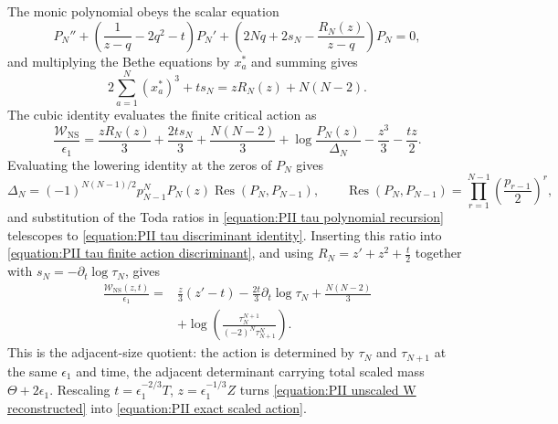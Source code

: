 \documentclass[a4paper,11pt]{article}
\numberwithin{equation}{section}
\begin{document}
The monic polynomial obeys the scalar equation
\begin{equation}
\label{equation:PII unscaled polynomial ode}
P_{N}''+\left(\frac{1}{z-q}-2q^{2}-t\right)P_{N}'
+\left(2Nq+2s_{N}-\frac{R_{N}(z)}{z-q}\right)P_{N}=0,
\end{equation}
and multiplying the Bethe equations by $x_{a}^{*}$ and summing
gives
\begin{equation}
\label{equation:PII unscaled cubic sum}
2\sum_{a=1}^{N}(x_{a}^{*})^{3}+ts_{N}=zR_{N}(z)+N(N-2).
\end{equation}
The cubic identity evaluates the finite critical action as
\begin{equation}
\label{equation:PII tau finite action discriminant}
\frac{\mathcal{W}_{\mathrm{NS}}}{\epsilon_{1}}
=\frac{zR_{N}(z)}{3}+\frac{2ts_{N}}{3}
+\frac{N(N-2)}{3}
+\log{\frac{P_{N}(z)}{\Delta_{N}}}
-\frac{z^{3}}{3}-\frac{tz}{2}.
\end{equation}
Evaluating the lowering identity at the zeros of $P_{N}$ gives
\begin{equation}
\label{equation:PII tau resultant}
\Delta_{N}=(-1)^{N(N-1)/2}p_{N-1}^{N}P_{N}(z)
\operatorname{Res}{(P_{N},P_{N-1})},
\qquad
\operatorname{Res}{(P_{N},P_{N-1})}
=\prod_{r=1}^{N-1}\left(\frac{p_{r-1}}{2}\right)^{r},
\end{equation}
and substitution of the Toda ratios in
\eqref{equation:PII tau polynomial recursion} telescopes to
\eqref{equation:PII tau discriminant identity}.  Inserting this
ratio into \eqref{equation:PII tau finite action discriminant}, and
using $R_{N}=z'+z^{2}+\frac{t}{2}$ together with
$s_{N}=-\partial_{t}\log{\tau_{N}}$, gives
\begin{equation}
\label{equation:PII unscaled W reconstructed}
\begin{aligned}
\frac{\mathcal{W}_{\mathrm{NS}}(z,t)}{\epsilon_{1}}
={}&\frac{z}{3}(z'-t)
-\frac{2t}{3}\partial_{t}\log{\tau_{N}}
+\frac{N(N-2)}{3}\\
&+\log{\left(\frac{\tau_{N}^{N+1}}{(-2)^{N}\tau_{N+1}^{N}}\right)}.
\end{aligned}
\end{equation}
This is the adjacent-size quotient: the action is determined by
$\tau_{N}$ and $\tau_{N+1}$ at the same $\epsilon_{1}$ and time, the
adjacent determinant carrying total scaled mass
$\Theta+2\epsilon_{1}$.  Rescaling
$t=\epsilon_{1}^{-2/3}T$, $z=\epsilon_{1}^{-1/3}Z$ turns
\eqref{equation:PII unscaled W reconstructed} into
\eqref{equation:PII exact scaled action}.
\end{document}
